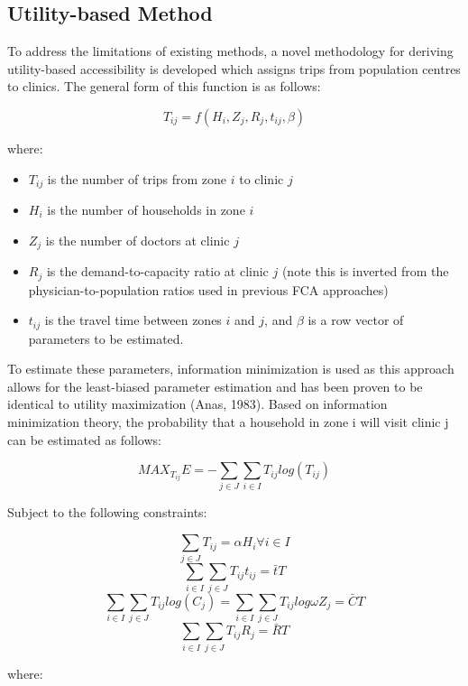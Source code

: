 \documentclass[]{elsarticle} %
\providecommand{\tightlist}{%
  \setlength{\itemsep}{0pt}\setlength{\parskip}{0pt}}
\begin{document}
\hypertarget{utility-based-method}{%
\subsection{Utility-based Method}\label{utility-based-method}}

To address the limitations of existing methods, a novel methodology for
deriving utility-based accessibility is developed which assigns trips
from population centres to clinics. The general form of this function is
as follows:

\[
T_{ij} = f(H_i, Z_j, R_j, t_{ij}, \beta)
\]

where:

\begin{itemize}
\tightlist
\item
  \(T_{ij}\) is the number of trips from zone \(i\) to clinic \(j\)
\item
  \(H_i\) is the number of households in zone \(i\)
\item
  \(Z_j\) is the number of doctors at clinic \(j\)
\item
  \(R_j\) is the demand-to-capacity ratio at clinic \(j\) (note this is
  inverted from the physician-to-population ratios used in previous FCA
  approaches)
\item
  \(t_{ij}\) is the travel time between zones \(i\) and \(j\), and
  \(\beta\) is a row vector of parameters to be estimated.
\end{itemize}

To estimate these parameters, information minimization is used as this
approach allows for the least-biased parameter estimation and has been
proven to be identical to utility maximization (Anas, 1983). Based on
information minimization theory, the probability that a household in
zone i will visit clinic j can be estimated as follows:

\[
MAX_{T_{ij}} E = -\sum_{j \in J} \sum_{i \in I} T_{ij} log(T_{ij})
\]

Subject to the following constraints:

\[
\sum_{j \in J}T_{ij} = \alpha H_i \forall i \in I 
\] \[
\sum_{i \in I} \sum_{j \in J} T_{ij} t_{ij} = \bar{t}T 
\] \[
\sum_{i \in I} \sum_{j \in J} T_{ij} log(C_j) = \sum_{i \in I} \sum_{j \in J}T_{ij} log \omega Z_j = \bar{C}T 
\] \[
\sum_{i \in I} \sum_{j \in J} T_{ij} R_j = \bar{R}T
\]

where:
\end{document}
